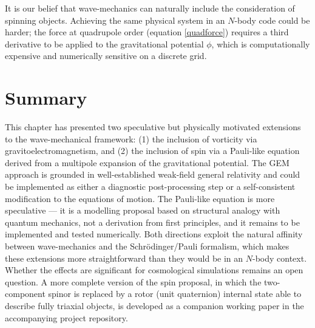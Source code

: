 It is our belief that wave-mechanics can naturally include the consideration of spinning objects. Achieving the same physical system in an $N$-body code could be harder; the force at quadrupole order (equation \ref{quadforce}) requires a third derivative to be applied to the gravitational potential $\phi$, which is computationally expensive and numerically sensitive on a discrete grid.

\section{Summary}
This chapter has presented two speculative but physically motivated extensions to the wave-mechanical framework: (1) the inclusion of vorticity via gravitoelectromagnetism, and (2) the inclusion of spin via a Pauli-like equation derived from a multipole expansion of the gravitational potential. The GEM approach is grounded in well-established weak-field general relativity and could be implemented as either a diagnostic post-processing step or a self-consistent modification to the equations of motion. The Pauli-like equation is more speculative — it is a modelling proposal based on structural analogy with quantum mechanics, not a derivation from first principles, and it remains to be implemented and tested numerically. Both directions exploit the natural affinity between wave-mechanics and the Schr\"odinger/Pauli formalism, which makes these extensions more straightforward than they would be in an $N$-body context. Whether the effects are significant for cosmological simulations remains an open question. A more complete version of the spin proposal, in which the two-component spinor is replaced by a rotor (unit quaternion) internal state able to describe fully triaxial objects, is developed as a companion working paper in the accompanying project repository.











